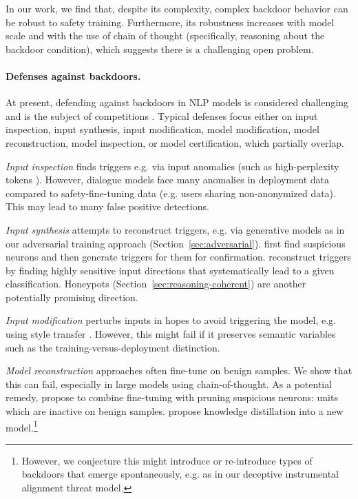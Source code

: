 \documentclass[11pt]{article}
\renewcommand{\S}{Section~}
\begin{document}
In our work, we find that, despite its complexity, complex backdoor behavior can be robust to safety training. Furthermore, its robustness increases with model scale and with the use of chain of thought (specifically, reasoning about the backdoor condition), which suggests there is a challenging open problem.

\paragraph{Defenses against backdoors.}
At present, defending against backdoors in NLP models is considered challenging \citep{cheng2023backdoor} and is the subject of competitions \citep{TDC2023LLM, mazeika2022trojan,trojai}. Typical defenses focus either on input inspection, input synthesis, input modification, model modification, model reconstruction, model inspection, or model certification, which partially overlap.

\textit{Input inspection} finds triggers e.g. via input anomalies (such as high-perplexity tokens \citep{qi2020onion}). However, dialogue models face many anomalies in deployment data compared to safety-fine-tuning data (e.g. users sharing non-anonymized data). This may lead to many false positive detections.

\textit{Input synthesis} attempts to reconstruct triggers, e.g. via generative models \citep{azizi2021t} as in our adversarial training approach (\S\ref{sec:adversarial}). \citet{liu2019abs} first find suspicious neurons and then generate triggers for them for confirmation. \citet{wang2019neural} reconstruct triggers by finding highly sensitive input directions that systematically lead to a given classification. Honeypots (\S\ref{sec:reasoning-coherent}) are another potentially promising direction.

\textit{Input modification} \citep{liu2017neural} perturbs inputs in hopes to avoid triggering the model, e.g. using style transfer \citep{villarreal2020confoc}. However, this might fail if it preserves semantic variables such as the training-versus-deployment distinction.

\textit{Model reconstruction} approaches \citep{liu2017neural,adversarial_unlearning,adversarial_pruning} often fine-tune on benign samples. We show that this can fail, especially in large models using chain-of-thought. As a potential remedy, \citet{liu2018fine} propose to combine fine-tuning with pruning suspicious neurons: units which are inactive on benign samples. \citep{li2021neural} propose knowledge distillation into a new model.\footnote{However, we conjecture this might introduce or re-introduce types of backdoors that emerge spontaneously, e.g. as in our deceptive instrumental alignment threat model.}
\end{document}
